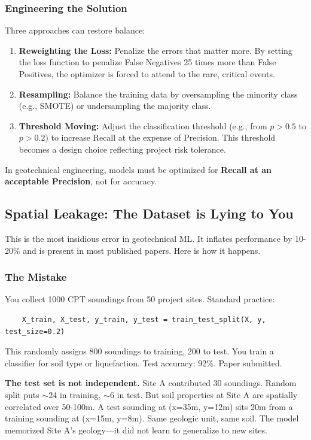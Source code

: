 \documentclass[12pt]{article}
\begin{document}
\subsubsection{Engineering the Solution}
Three approaches can restore balance:
\begin{enumerate}
	\item \textbf{Reweighting the Loss:} Penalize the errors that matter more. By setting the loss function to penalize False Negatives 25 times more than False Positives, the optimizer is forced to attend to the rare, critical events.
	\item \textbf{Resampling:} Balance the training data by oversampling the minority class (e.g., SMOTE) or undersampling the majority class.
	\item \textbf{Threshold Moving:} Adjust the classification threshold (e.g., from $p > 0.5$ to $p > 0.2$) to increase Recall at the expense of Precision. This threshold becomes a design choice reflecting project risk tolerance.
\end{enumerate}
In geotechnical engineering, models must be optimized for \textbf{Recall at an acceptable Precision}, not for accuracy.

\subsection{Spatial Leakage: The Dataset is Lying to You}

This is the most insidious error in geotechnical ML. It inflates performance by 10-20\% and is present in most published papers. Here is how it happens.

\subsubsection{The Mistake}

You collect 1000 CPT soundings from 50 project sites. Standard practice:

\begin{lstlisting}
	X_train, X_test, y_train, y_test = train_test_split(X, y, test_size=0.2)
\end{lstlisting}

This randomly assigns 800 soundings to training, 200 to test. You train a classifier for soil type or liquefaction. Test accuracy: 92\%. Paper submitted.

\textbf{The test set is not independent.} Site A contributed 30 soundings. Random split puts $\sim$24 in training, $\sim$6 in test. But soil properties at Site A are spatially correlated over 50-100m. A test sounding at (x=35m, y=12m) sits 20m from a training sounding at (x=15m, y=8m). Same geologic unit, same soil. The model memorized Site A's geology---it did not learn to generalize to new sites.
\end{document}
